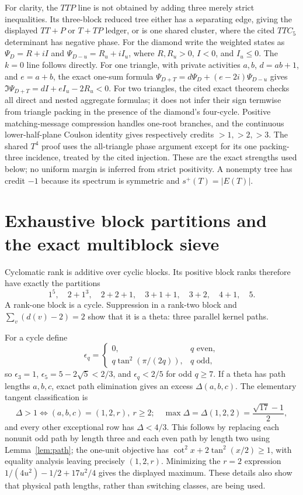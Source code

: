 \documentclass[11pt]{article}
\theoremstyle{remark}
\newcommand{\spn}{s^+}
\begin{document}
For clarity, the $TTP$ line is not obtained by adding three merely strict
inequalities.  Its three-block reduced tree either has a separating edge,
giving the displayed $TT+P$ or $T+TP$ ledger, or is one shared cluster, where
the cited $TTC_5$ determinant has negative phase.  For the diamond write the
weighted states as $\Psi_D=R+iI$ and
$\Psi_{D-u}=R_u+iI_u$, where $R,R_u>0$, $I<0$, and $I_u\le0$.
The $k=0$ line follows directly.  For one triangle, with private activities
$a,b$, $d=ab+1$, and $e=a+b$, the exact one-sum formula
$\Psi_{D+T}=d\Psi_D+(e-2i)\Psi_{D-u}$ gives
$\Im\Psi_{D+T}=dI+eI_u-2R_u<0$.  For two triangles, the cited exact theorem
checks all direct and nested aggregate formulas; it does not infer their sign
termwise from triangle packing in the presence of the diamond's four-cycle.
Positive matching-message compression handles one-root branches, and the
continuous lower-half-plane Coulson identity gives respectively credits
$>1,>2,>3$.  The shared $T^4$ proof uses the all-triangle phase argument except
for its one packing-three incidence, treated by the cited injection.  These are
the exact strengths used below; no uniform margin is inferred from strict
positivity.  A nonempty tree has credit $-1$ because its spectrum is symmetric
and $\spn(T)=|E(T)|$.

\section{Exhaustive block partitions and the exact multiblock sieve}

Cyclomatic rank is additive over cyclic blocks.  Its positive block ranks
therefore have exactly the partitions
\begin{equation}\label{eq:partitions}
 1^5,\quad2+1^3,\quad2+2+1,\quad3+1+1,\quad3+2,\quad4+1,\quad5.
\end{equation}
A rank-one block is a cycle.  Suppression in a rank-two block and
$\sum_v(d(v)-2)=2$ show that it is a theta: three parallel kernel paths.

For a cycle define
\[
 \epsilon_q=\begin{cases}0,&q\text{ even},\\
 q\tan^2(\pi/(2q)),&q\text{ odd},\end{cases}
\]
so $\epsilon_3=1$, $\epsilon_5=5-2\sqrt5<2/3$, and
$\epsilon_q<2/5$ for odd $q\ge7$.  If a theta has path lengths $a,b,c$, exact
path elimination gives an excess $\Delta(a,b,c)$.  The elementary tangent
classification is
\begin{equation}\label{eq:theta}
 \Delta>1\iff(a,b,c)=(1,2,r),\ r\ge2;
 \quad\max\Delta=\Delta(1,2,2)=\frac{\sqrt{17}-1}{2},
\end{equation}
and every other exceptional row has $\Delta<4/3$.  This follows by replacing
each nonunit odd path by length three and each even path by length two using
Lemma~\ref{lem:path}; the one-unit objective has
$\cot^2x+2\tan^2(x/2)\ge1$, with equality analysis leaving precisely
$(1,2,r)$.  Minimizing the $r=2$ expression
$1/(4u^2)-1/2+17u^2/4$ gives the displayed maximum.  These details also show
that physical path lengths, rather than switching classes, are being used.
\end{document}
